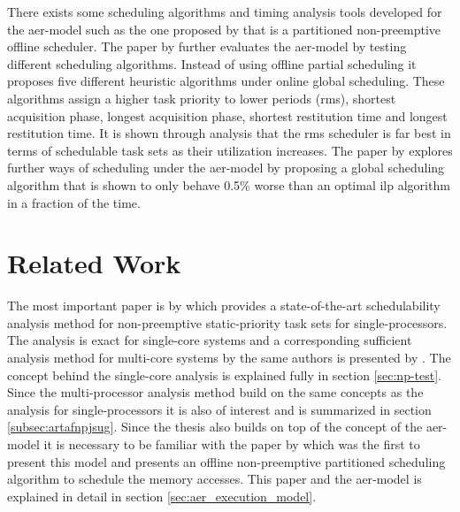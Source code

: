 \documentclass{kththesis}
\begin{document}
There exists some scheduling algorithms and timing analysis tools developed for the
\acrshort{aer}-model such as the one proposed by \textcite{durrieu_predictable_2014} that is a
partitioned non-preemptive offline scheduler. The paper by \textcite{maia_closer_2016} further
evaluates the
\acrshort{aer}-model by testing different scheduling algorithms. Instead of using offline partial
scheduling it proposes five different heuristic algorithms under online global scheduling. These
algorithms assign a higher task priority to lower periods (\acrshort{rms}), shortest acquisition
phase, longest acquisition phase, shortest restitution time and longest restitution time. It is
shown through analysis that the \acrshort{rms} scheduler is far best in terms of schedulable task
sets as their utilization increases. The paper by \textcite{becker_contention-free_2016} explores
further ways of scheduling under the \acrshort{aer}-model by proposing a global scheduling algorithm
that is shown to only behave 0.5\% worse than an optimal \acrfull{ilp} algorithm in a fraction of
the time.



\section{Related Work} \label{sec:related_work}

The most important paper is by \textcite{nasri_exact_2017} which provides a state-of-the-art
schedulability analysis method for non-preemptive static-priority task sets for single-processors.
The analysis is exact for single-core systems and a corresponding sufficient analysis method for
multi-core systems by the same authors is presented by \textcite{nasri_response-time_2018}. The
concept behind the single-core analysis is explained fully in section \ref{sec:np-test}. Since the
multi-processor analysis method build on the same concepts as the analysis for single-processors it
is also of interest and is summarized in section \ref{subsec:artafnpjsug}. Since the thesis also
builds on top of the concept of the \acrshort{aer}-model it is necessary to be familiar with the
paper by \textcite{durrieu_predictable_2014} which was the first to present this model and presents an
offline non-preemptive partitioned scheduling algorithm to schedule the memory accesses. This paper
and the \acrshort{aer}-model is explained in detail in section \ref{sec:aer_execution_model}.
\end{document}
